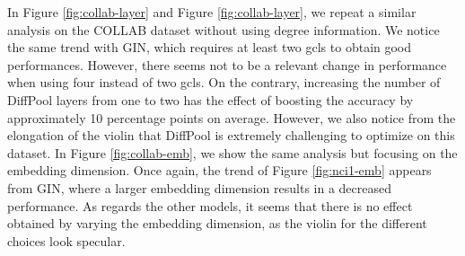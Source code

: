 In Figure \ref{fig:collab-layer} and Figure \ref{fig:collab-layer}, we repeat a similar analysis on the COLLAB dataset without using degree information. We notice the same trend with GIN, which requires at least two \glspl{gcl} to obtain good performances. However, there seems not to be a relevant change in performance when using four instead of two \glspl{gcl}. On the contrary, increasing the number of DiffPool layers from one to two has the effect of boosting the accuracy by approximately 10 percentage points on average. However, we also notice from the elongation of the violin that DiffPool is extremely challenging to optimize on this dataset. In Figure \ref{fig:collab-emb}, we show the same analysis but focusing on the embedding dimension. Once again, the trend of Figure \ref{fig:nci1-emb} appears from GIN, where a larger embedding dimension results in a decreased performance. As regards the other models, it seems that there is no effect obtained by varying the embedding dimension, as the violin for the different choices look specular.

